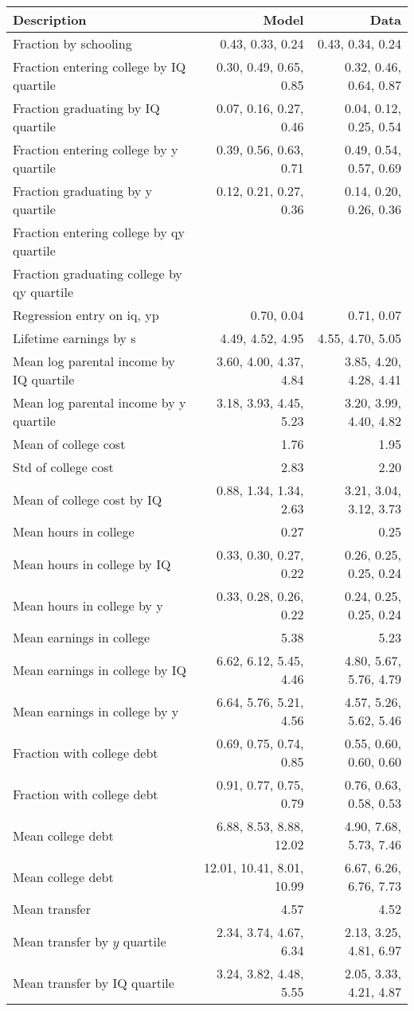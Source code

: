 \begin{tabular}{lrr}
\hline
Description & Model  & Data  \\
\hline
Fraction by schooling & 0.43, 0.33, 0.24  & 0.43, 0.34, 0.24  \\
Fraction entering college by IQ quartile & 0.30, 0.49, 0.65, 0.85  & 0.32, 0.46, 0.64, 0.87  \\
Fraction graduating by IQ quartile & 0.07, 0.16, 0.27, 0.46  & 0.04, 0.12, 0.25, 0.54  \\
Fraction entering college by y quartile & 0.39, 0.56, 0.63, 0.71  & 0.49, 0.54, 0.57, 0.69  \\
Fraction graduating by y quartile & 0.12, 0.21, 0.27, 0.36  & 0.14, 0.20, 0.26, 0.36  \\
Fraction entering college by qy quartile &   &   \\
Fraction graduating college by qy quartile &   &   \\
Regression entry on iq, yp & 0.70, 0.04  & 0.71, 0.07  \\
Lifetime earnings by s & 4.49, 4.52, 4.95  & 4.55, 4.70, 5.05  \\
Mean log parental income by IQ quartile & 3.60, 4.00, 4.37, 4.84  & 3.85, 4.20, 4.28, 4.41  \\
Mean log parental income by y quartile & 3.18, 3.93, 4.45, 5.23  & 3.20, 3.99, 4.40, 4.82  \\
Mean of college cost & 1.76  & 1.95  \\
Std of college cost & 2.83  & 2.20  \\
Mean of college cost by IQ & 0.88, 1.34, 1.34, 2.63  & 3.21, 3.04, 3.12, 3.73  \\
Mean hours in college & 0.27  & 0.25  \\
Mean hours in college by IQ & 0.33, 0.30, 0.27, 0.22  & 0.26, 0.25, 0.25, 0.24  \\
Mean hours in college by y & 0.33, 0.28, 0.26, 0.22  & 0.24, 0.25, 0.25, 0.24  \\
Mean earnings in college & 5.38  & 5.23  \\
Mean earnings in college by IQ & 6.62, 6.12, 5.45, 4.46  & 4.80, 5.67, 5.76, 4.79  \\
Mean earnings in college by y & 6.64, 5.76, 5.21, 4.56  & 4.57, 5.26, 5.62, 5.46  \\
Fraction with college debt & 0.69, 0.75, 0.74, 0.85  & 0.55, 0.60, 0.60, 0.60  \\
Fraction with college debt & 0.91, 0.77, 0.75, 0.79  & 0.76, 0.63, 0.58, 0.53  \\
Mean college debt & 6.88, 8.53, 8.88, 12.02  & 4.90, 7.68, 5.73, 7.46  \\
Mean college debt & 12.01, 10.41, 8.01, 10.99  & 6.67, 6.26, 6.76, 7.73  \\
Mean transfer & 4.57  & 4.52  \\
Mean transfer by $y$ quartile & 2.34, 3.74, 4.67, 6.34  & 2.13, 3.25, 4.81, 6.97  \\
Mean transfer by IQ quartile & 3.24, 3.82, 4.48, 5.55  & 2.05, 3.33, 4.21, 4.87  \\
\hline
\end{tabular}%
